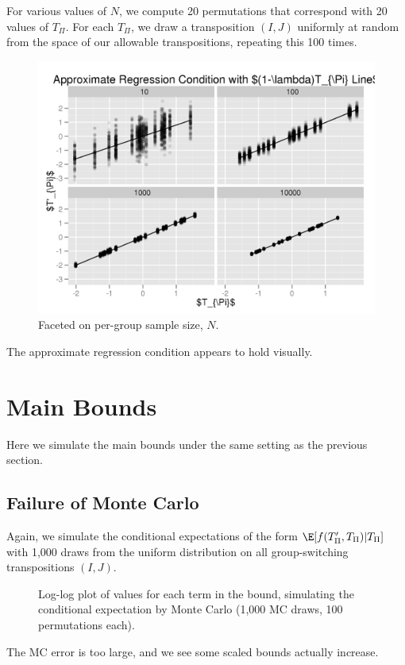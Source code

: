 For various values of $N$, we compute 20 permutations that correspond with 20 values of $T_{\Pi}$.
For each $T_{\Pi}$, we draw a transposition $(I, J)$ uniformly at random from the space of our
allowable transpositions, repeating this 100 times.  
\begin{figure}[!ht]
  \centering
  \includegraphics[scale = .75]{./simulations/sim7.png}
  \caption{Faceted on per-group sample size, $N$.}
\end{figure}

The approximate regression condition appears to hold visually.
\clearpage

\section{Main Bounds}
Here we simulate the main bounds under the same setting as the previous section.  
\subsection{Failure of Monte Carlo}
Again, we simulate the conditional expectations of the form $\E[f(T'_{\Pi}, T_{\Pi}) | T_{\Pi}]$
with 1,000 draws from the uniform distribution on all group-switching transpositions $(I, J)$.

\begin{figure}[!ht]
  \centering
  
  \caption{Log-log plot of values for each term in the bound, simulating the conditional expectation
    by Monte Carlo (1,000 MC draws, 100 permutations each).}
\end{figure}
The MC error is too large, and we see some scaled bounds actually increase.
\clearpage

